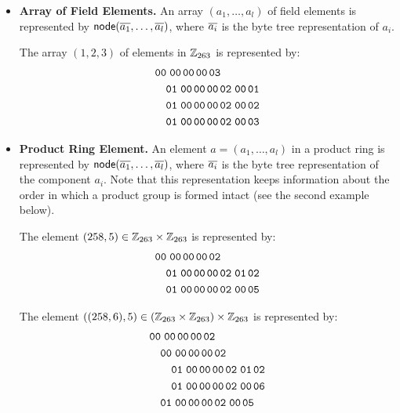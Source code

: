 \documentclass[11pt]{article}
\begin{document}
\begin{itemize}
\item\textbf{Array of Field Elements.} An array $(a_1,\ldots,a_l)$ of
  field elements is represented by $\textsf{node}(\overline{a_1},\ldots,\overline{a_l})$,
  where $\overline{a_i}$ is the byte tree representation of $a_i$.

  \begin{example}
    The array $(1,2,3)$ of elements in $\mathbb{Z}_{263}$ is represented by:
    \begin{align*}
      &\hex{00\cutt00\cut00\cut00\cut03}\\
      &\quad\hex{01\cutt00\cut00\cut00\cut02\cutt00\cut01}\\
      &\quad\hex{01\cutt00\cut00\cut00\cut02\cutt00\cut02}\\
      &\quad\hex{01\cutt00\cut00\cut00\cut02\cutt00\cut03}
    \end{align*}
  \end{example}

\item\textbf{Product Ring Element.} An element $a=(a_1,\ldots,a_l)$ in
  a product ring is represented by $\textsf{node}(\overline{a_1},\ldots,\overline{a_l})$,
  where $\overline{a_i}$ is the byte tree representation of the component
  $a_i$. Note that this representation keeps information about the
  order in which a product group is formed intact (see the second
  example below).

  \begin{example}
    The element $(258,5)\in\mathbb{Z}_{263}\times\mathbb{Z}_{263}$ is represented
    by:
    \begin{align*}
      &\hex{00\cutt00\cut00\cut00\cut02}\\
      &\quad\hex{01\cutt00\cut00\cut00\cut02\cutt01\cut02}\\
      &\quad\hex{01\cutt00\cut00\cut00\cut02\cutt00\cut05}
    \end{align*}
  \end{example}
  \begin{example}
    The element
    $((258,6),5)\in(\mathbb{Z}_{263}\times\mathbb{Z}_{263})\times\mathbb{Z}_{263}$ is
    represented by:
    \begin{align*}
      &\hex{00\cutt00\cut00\cut00\cut02}\\
      &\quad\hex{00\cutt00\cut00\cut00\cut02}\\
      &\quad\quad\hex{01\cutt00\cut00\cut00\cut02\cutt01\cut02}\\
      &\quad\quad\hex{01\cutt00\cut00\cut00\cut02\cutt00\cut06}\\
      &\quad\hex{01\cutt00\cut00\cut00\cut02\cutt00\cut05}
    \end{align*}
  \end{example}


\end{itemize}
\end{document}
